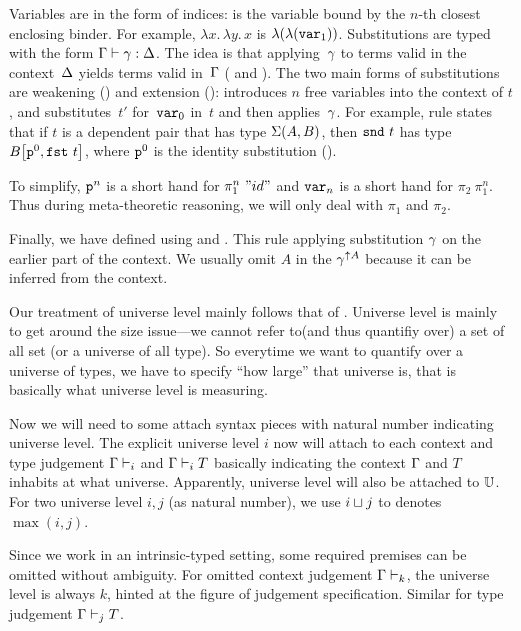 Variables are in the form of \citeauthor{debruijn1964} indices:
 is the variable bound by the $n$-th closest enclosing binder.
For example, $\lambda x.\,\lambda y.\,x$ is $\lam{\lam{\var{1}}}$.
%
Substitutions are typed with the form 
$\goodSub{\Gm}{\gm}{\Dl}$.
The idea is that applying~$\gm$ to terms valid in the context~$\Dl$
yields terms valid in~$\Gm$ ( and ).
%
The two main forms of substitutions are weakening () and extension ():
 introduces $n$ free variables into the context of $t$, and
 substitutes~$t'$ for~$\var{0}$ in~$t$ and
then applies~$\gm$.
For example, rule  states that if $t$ is a dependent pair
that has type $\TySigma{A}{B}$, then $\snd{t}$ has type
$\sub{B}{\SubstExt{\SubstWeak{0}}{\fst{t}}}$,
where $\SubstId$ is the identity substitution ().

To simplify, $\SubstWeak{n}$ is a short hand for $\pi_1^n~"id"$ and $\var{n}$ is a short hand for $\pi_2~\pi_1^{n}$. Thus during meta-theoretic reasoning, we will only deal with $\pi_1$ and $\pi_2$.

Finally, we have  defined using  and . This rule applying substitution $\gm$ on the earlier part of the context. We usually omit $A$ in the $\gm^{\uparrow A}$ because it can be inferred from the context.



 Our treatment of universe level mainly follows that of \citet{altkap2016, kaposi2019gluing}. Universe level is mainly to get around the size issue---we cannot refer to(and thus quantifiy over) a set of all set (or a universe of all type). So everytime we want to quantify over a universe of types, we have to specify ``how large'' that universe is, that is basically what universe level is measuring. 



Now we will need to some attach syntax pieces with natural number indicating universe level. The explicit universe level $i$ now will attach to each context and type judgement $\goodCtx{\Gm}{i}$ and $\goodType{\Gm}{T}{i}$ basically indicating the context $\Gm$ and $T$ inhabits at what universe. Apparently, universe level will also be attached to $\cU$. For two universe level $i,j$ (as natural number), we use $i \lcup j$ to denotes $\max(i,j)$.

Since we work in an intrinsic-typed setting, some required premises can be omitted without ambiguity. For omitted context judgement $\goodCtx{\Gm}{k}$, the universe level is always $k$, hinted at the figure of judgement specification. Similar for type judgement $\goodType{\Gm}{T}{j}$.



